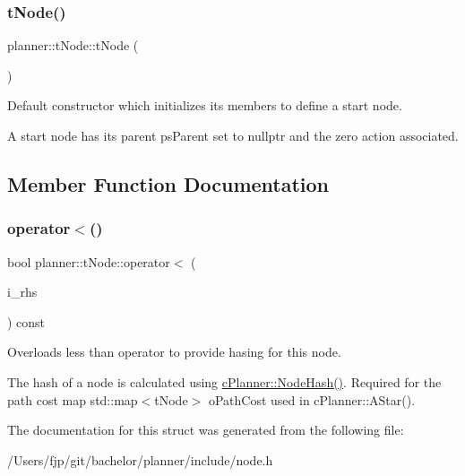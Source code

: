 \subsubsection{\texorpdfstring{t\+Node()}{tNode()}}
{\footnotesize\ttfamily planner\+::t\+Node\+::t\+Node (\begin{DoxyParamCaption}{ }\end{DoxyParamCaption})\hspace{0.3cm}{\ttfamily [inline]}}



Default constructor which initializes its members to define a start node. 

A start node has its parent ps\+Parent set to nullptr and the zero action associated. 

\subsection{Member Function Documentation}
\mbox{\label{structplanner_1_1t_node_a5085f3fcf4a960ed9fe14068f1b5e950}} 
\subsubsection{\texorpdfstring{operator$<$()}{operator<()}}
{\footnotesize\ttfamily bool planner\+::t\+Node\+::operator$<$ (\begin{DoxyParamCaption}\item[{const \mbox{\hyperlink{structplanner_1_1t_node}{t\+Node}} \&}]{i\+\_\+rhs }\end{DoxyParamCaption}) const\hspace{0.3cm}{\ttfamily [inline]}}



Overloads less than operator to provide hasing for this node. 

The hash of a node is calculated using \mbox{\hyperlink{classplanner_1_1c_planner_a5ae4464a4d418cda71f4a8133d592c93}{c\+Planner\+::\+Node\+Hash()}}. Required for the path cost map std\+::map$<$t\+Node$>$ o\+Path\+Cost used in c\+Planner\+::\+A\+Star(). 

The documentation for this struct was generated from the following file\+:\begin{DoxyCompactItemize}
\item 
/\+Users/fjp/git/bachelor/planner/include/node.\+h\end{DoxyCompactItemize}
